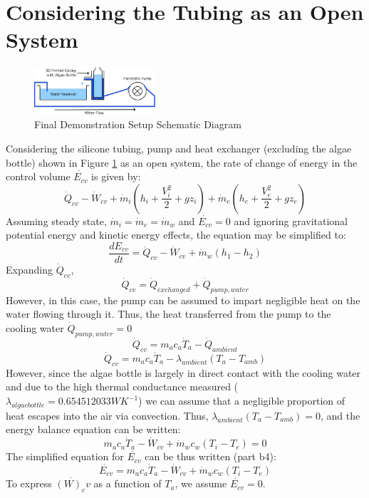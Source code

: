 \documentclass[10pt,a4paper]{IEEEtran}
\begin{document}
	\section{Considering the Tubing as an Open System}
	\begin{figure}[H]
		\begin{center}
			\includegraphics[width=0.4\textwidth]{demo_setup.png}
			\caption{Final Demonstration Setup Schematic Diagram}
			\label{fig:demo_setup}
		\end{center}
	\end{figure}
	Considering the silicone tubing, pump and heat exchanger (excluding the algae bottle) shown in Figure \ref{fig:demo_setup} as an open system, the rate of change of energy in the control volume $\dot{E_{cv}}$ is given by:
	$$\dot{Q}_{cv} - \dot{W}_{cv} + \dot{m}_{i} \left( h_i + \frac{V_i^2}{2} + gz_i \right) + \dot{m}_{e} \left( h_e + \frac{V_e^2}{2} + gz_e \right)$$
	Assuming steady state, $\dot{m}_{i} = \dot{m}_{e} = \dot{m}_w$ and $\dot{E_{cv}} = 0$ and ignoring gravitational potential energy and kinetic energy effects, the equation may be simplified to:
	$$\frac{dE_{cv}}{dt} = \dot{Q}_{cv} - \dot{W}_{cv} + \dot{m}_w \left( h_1 - h_2 \right)$$
	Expanding $\dot{Q}_{cv}$,
	$$\dot{Q}_{cv} = \dot{Q}_{exchanged} + \dot{Q}_{pump,water}$$
	However, in this case, the pump can be assumed to impart negligible heat on the water flowing through it. Thus, the heat transferred from the pump to the cooling water $\dot{Q}_{pump,water} = 0$
	$$\dot{Q}_{cv} = m_a c_a \dot{T}_a - \dot{Q}_{ambient}$$
	$$\dot{Q}_{cv} = m_a c_a \dot{T}_a - \lambda_{ambient} \left( T_a - T_{amb} \right)$$
	However, since the algae bottle is largely in direct contact with the cooling water and due to the high thermal conductance measured ($\lambda_{algae bottle} = 0.654512033 W K^{-1}$) we can assume that a negligible proportion of heat escapes into the air via convection. Thus, $\lambda_{ambient} \left( T_a - T_{amb} \right) = 0$, and the energy balance equation can be written:
	$$m_a c_a \dot{T}_a - \dot{W}_{cv} + \dot{m}_w c_w ( T_i - T_e ) = 0$$
	The simplified equation for $\dot{E_{cv}}$ can be thus written (part b4):
	$$\dot{E_{cv}} = m_a c_a \dot{T}_a - \dot{W}_{cv} + \dot{m}_w c_w ( T_i - T_e )$$
	To express $\dot{(W)_cv}$ as a function of $T_a$, we assume $\dot{E_{cv}} = 0$.
\end{document}
